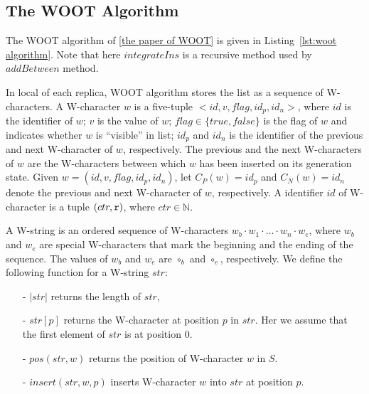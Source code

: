 















\forget
{
\subsection{The WOOT Algorithm}
\label{subsec:the woot algorithm}

The WOOT algorithm of \ref{the paper of WOOT} is given in Listing~\ref{lst:woot algorithm}. Note that here $integrateIns$ is a recursive method used by $addBetween$ method.

In local of each replica, WOOT algorithm stores the list as a sequence of W-characters. A W-character $w$ is a five-tuple $<id,v,flag,id_p,id_n>$, where $id$ is the identifier of $w$; $v$ is the value of $w$; $flag \in \{ \mathit{true},\mathit{false} \}$ is the flag of $w$ and indicates whether $w$ is ``visible'' in list; $id_p$ and $id_n$ is the identifier of the previous and next W-character of $w$, respectively. The previous and the next W-characters of $w$ are the W-characters between which $w$ has been inserted on its generation state. Given $w = (id,v,flag,id_p,id_n)$, let $C_P(w) = id_p$ and $C_N(w) = id_n$ denote the previous and next W-character of $w$, respectively. A identifier $id$ of W-character is a tuple $(ctr,\mathtt{r})$, where $ctr \in \mathbb{N}$.

A W-string is an ordered sequence of W-characters $w_b \cdot w_1 \cdot \ldots \cdot w_n \cdot w_e$, where $w_b$ and $w_e$ are special W-characters that mark the beginning and the ending of the sequence. The values of $w_b$ and $w_e$ are $\circ_b$ and $\circ_e$, respectively. We define the following function for a W-string $str$:

\begin{itemize}
\setlength{\itemsep}{0.5pt}
\item[-] $\vert str \vert$ returns the length of $str$,

\item[-] $str[p]$ returns the W-character at position $p$ in $str$. Her we assume that the first element of $str$ is at position 0.

\item[-] $pos(str,w)$ returns the position of W-character $w$ in $S$.

\item[-] $insert(str,w,p)$ inserts W-character $w$ into $str$ at position $p$.


\end{itemize}}
